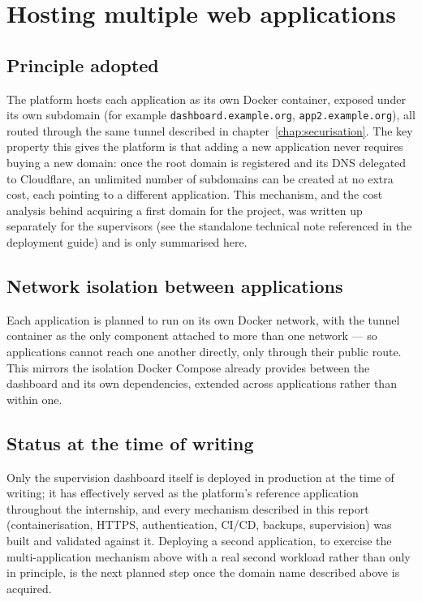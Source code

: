 \chapter{Hosting multiple web applications}
\label{chap:multiapps}

\section{Principle adopted}
The platform hosts each application as its own Docker container, exposed under its own subdomain (for example \texttt{dashboard.example.org}, \texttt{app2.example.org}), all routed through the same tunnel described in chapter~\ref{chap:securisation}. The key property this gives the platform is that adding a new application never requires buying a new domain: once the root domain is registered and its DNS delegated to Cloudflare, an unlimited number of subdomains can be created at no extra cost, each pointing to a different application. This mechanism, and the cost analysis behind acquiring a first domain for the project, was written up separately for the supervisors (see the standalone technical note referenced in the deployment guide) and is only summarised here.

\section{Network isolation between applications}
Each application is planned to run on its own Docker network, with the tunnel container as the only component attached to more than one network — so applications cannot reach one another directly, only through their public route. This mirrors the isolation Docker Compose already provides between the dashboard and its own dependencies, extended across applications rather than within one.

\section{Status at the time of writing}
Only the supervision dashboard itself is deployed in production at the time of writing; it has effectively served as the platform's reference application throughout the internship, and every mechanism described in this report (containerisation, HTTPS, authentication, CI/CD, backups, supervision) was built and validated against it. Deploying a second application, to exercise the multi-application mechanism above with a real second workload rather than only in principle, is the next planned step once the domain name described above is acquired.

\clearpage
